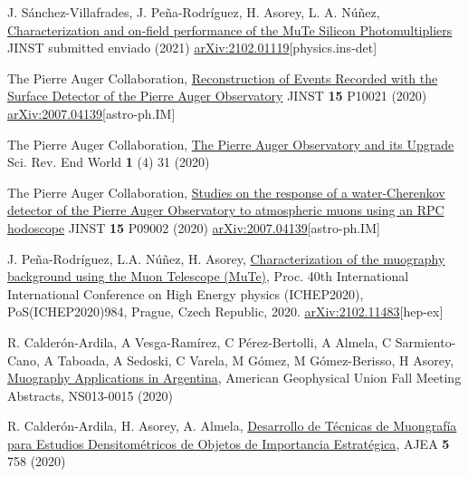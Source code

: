 \begin{etaremune}
\item {} J. Sánchez-Villafrades, J. Peña-Rodríguez, H. Asorey, L. A. Núñez, \href{}{Characterization and on-field performance of the MuTe Silicon Photomultipliers} JINST \ifeng submitted \else enviado \fi (2021) \href{https://arxiv.org/abs/2102.01119}{arXiv:2102.01119}[physics.ins-det]

\item {}The Pierre Auger Collaboration, \href{https://doi.org/10.1088/1748-0221/15/10/P10021}{Reconstruction of Events Recorded with the Surface Detector of the Pierre Auger Observatory} JINST {\bf{15}} P10021 (2020) \href{https://arxiv.org/abs/2007.04139}{arXiv:2007.04139}[astro-ph.IM]

\item {}The Pierre Auger Collaboration, \href{https://doi.org/10.52712/sciencereviews.v1i4.31}{The Pierre Auger Observatory and its Upgrade} Sci. Rev. End World {\bf{1}} (4) 31 (2020)

\item {}The Pierre Auger Collaboration, \href{https://doi.org/10.1088/1748-0221/15/09/P09002}{Studies on the response of a water-Cherenkov detector of the Pierre Auger Observatory to atmospheric muons using an RPC hodoscope} JINST {\bf{15}} P09002 (2020) \href{https://arxiv.org/abs/2007.04139}{arXiv:2007.04139}[astro-ph.IM]

\item {} J. Peña-Rodríguez, L.A. Núñez, H. Asorey, \href{https://doi.org/10.22323/1.390.0984}{Characterization of the muography background using the Muon Telescope (MuTe)}, \en Proc. 40th International International Conference on High Energy physics (ICHEP2020), PoS(ICHEP2020)984, Prague,  Czech Republic, 2020. \href{http://arxiv.org/abs/2102.11483}{arXiv:2102.11483}[hep-ex]

\item {} R. Calderón-Ardila, A Vesga-Ramírez, C Pérez-Bertolli, A Almela, C Sarmiento-Cano, A Taboada, A Sedoski, C Varela, M Gómez, M Gómez-Berisso, H Asorey, \href{https://ui.adsabs.harvard.edu/abs/2020AGUFMNS0130015C/abstract}{Muography Applications in Argentina}, American Geophysical Union Fall Meeting Abstracts, NS013-0015 (2020)

\item {} R. Calderón-Ardila, H. Asorey, A. Almela, \href{https://doi.org/10.33414/ajea.5.758.2020}{Desarrollo de Técnicas de Muongrafía para Estudios Densitométricos de Objetos de Importancia Estratégica}, AJEA {\bf{5}} 758 (2020)


\end{etaremune}
